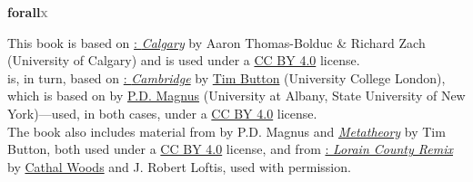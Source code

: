 

\pagestyle{empty}

\vspace*{80pt}

\begin{raggedleft}
\sffamily
{\Huge\textbf{{forall\hspace{.08em}\textcolor{gray}{x}}}}

\bigskip
{\large{\textcolor{maroon}{\uppercase{}}}}  

\bigskip


\vspace*{50pt}

{\small{\uppercase{}}}  



\vfill
{\small{\textls{\forallxversion}}}\par 	%

\end{raggedleft}


\newpage 


\noindent \small This book is based on \href{http://forallx.openlogicproject.org/}{\forallx:\emph{ Calgary}} by {Aaron Thomas-Bolduc \& Richard Zach} ({University of Calgary}) and is used under a \href{https://creativecommons.org/licenses/by/4.0/}{CC BY 4.0} license.\\[1ex] 

 is, in turn, based on \href{http://www.homepages.ucl.ac.uk/~uctytbu/OERs.html}{\forallx:\emph{ Cambridge}} by \href{http://www.homepages.ucl.ac.uk/~uctytbu/}{Tim Button} ({University College London}), 
which is based on \href{https://www.fecundity.com/logic/}{\forallx} by \href{https://www.fecundity.com/job/}{P.D. Magnus} (University at Albany, State University of New York)---used, in both cases, under a \href{https://creativecommons.org/licenses/by/4.0/}{CC BY 4.0} license.\\[1ex]


\noindent The book also includes material from \forallx{} by P.D. Magnus 
and \href{http://www.homepages.ucl.ac.uk/~uctytbu/OERs.html}{\emph{Metatheory}} by Tim Button, 
both used under a \href{https://creativecommons.org/licenses/by/4.0/}{CC BY 4.0} license, 
and from \href{https://github.com/rob-helpy-chalk/openintroduction}{\forallx: \emph{Lorain County Remix}} by \href{https://sites.google.com/site/cathalwoods/}{Cathal Woods} and J. Robert Loftis, used with permission.\\[1ex]


